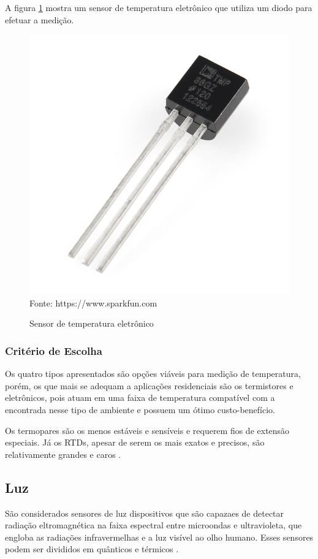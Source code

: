 A figura \ref{figura:e-thermsensor} mostra um sensor de temperatura eletrônico que utiliza um diodo para
efetuar a medição.

\begin{figure}[h]
	\caption{Sensor de temperatura eletrônico}
	\centering
	\includegraphics[scale=0.8]{../images/e-thermsensor.jpg}
	\hspace{\linewidth}
	Fonte: https://www.sparkfun.com
	\label{figura:e-thermsensor}
\end{figure}

\subsubsection{Critério de Escolha}
Os quatro tipos apresentados são opções viáveis para medição de temperatura, porém, os que mais se adequam a
aplicações residenciais são os termistores e eletrônicos, pois atuam em uma faixa de temperatura compatível
com a encontrada nesse tipo de ambiente e possuem um ótimo custo-benefício.

Os termopares são os menos estáveis e sensíveis e requerem fios de extensão especiais. Já os RTDs, apesar de
serem os mais exatos e precisos, são relativamente grandes e caros \cite{fontes2005}.

\subsection{Luz}
São considerados sensores de luz dispositivos que são capazaes de detectar radiação eltromagnética na faixa
espectral entre microondas e ultravioleta, que engloba as radiações infravermelhas e a luz visível ao olho
humano. Esses sensores podem ser divididos em quânticos e térmicos \cite{fraden2010}.

